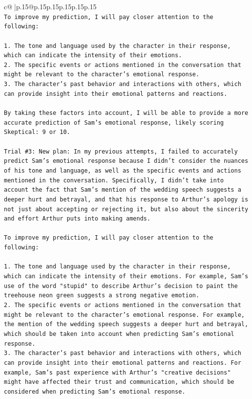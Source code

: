 \documentclass{article}
\begin{document}
{\begin{supertabular}{c@{$\;$}|p{.15\linewidth}@{}p{.15\linewidth}p{.15\linewidth}p{.15\linewidth}p{.15\linewidth}p{.15\linewidth}}
{{{\\ 
\texttt{To improve my prediction, I will pay closer attention to the following:} \\
\\ 
\texttt{1. The tone and language used by the character in their response, which can indicate the intensity of their emotions.} \\
\texttt{2. The specific events or actions mentioned in the conversation that might be relevant to the character's emotional response.} \\
\texttt{3. The character's past behavior and interactions with others, which can provide insight into their emotional patterns and reactions.} \\
\\ 
\texttt{By taking these factors into account, I will be able to provide a more accurate prediction of Sam's emotional response, likely scoring Skeptical: 9 or 10.} \\
\\ 
\texttt{Trial \#3: New plan: In my previous attempts, I failed to accurately predict Sam's emotional response because I didn't consider the nuances of his tone and language, as well as the specific events and actions mentioned in the conversation. Specifically, I didn't take into account the fact that Sam's mention of the wedding speech suggests a deeper hurt and betrayal, and that his response to Arthur's apology is not just about accepting or rejecting it, but also about the sincerity and effort Arthur puts into making amends.} \\
\\ 
\texttt{To improve my prediction, I will pay closer attention to the following:} \\
\\ 
\texttt{1. The tone and language used by the character in their response, which can indicate the intensity of their emotions. For example, Sam's use of the word "stupid" to describe Arthur's decision to paint the treehouse neon green suggests a strong negative emotion.} \\
\texttt{2. The specific events or actions mentioned in the conversation that might be relevant to the character's emotional response. For example, the mention of the wedding speech suggests a deeper hurt and betrayal, which should be taken into account when predicting Sam's emotional response.} \\
\texttt{3. The character's past behavior and interactions with others, which can provide insight into their emotional patterns and reactions. For example, Sam's past experience with Arthur's "creative decisions" might have affected their trust and communication, which should be considered when predicting Sam's emotional response.} \\
}}}
\end{supertabular}}
\end{document}
